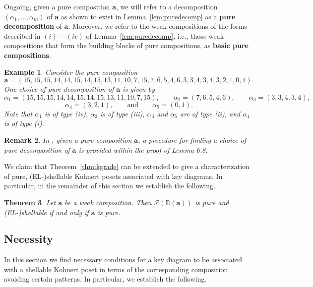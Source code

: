 \documentclass[letterpaper,10pt]{article}
\newtheorem{theorem}{Theorem}
\newtheorem{ex}[theorem]{Example}
\newtheorem{remark}[theorem]{Remark}
\begin{document}
Ongoing, given a pure composition $\mathbf{a}$, we will refer to a decomposition $(\alpha_1,\hdots,\alpha_m)$ of $\mathbf{a}$ as shown to exist in Lemma~\ref{lem:puredecomp} as a \textbf{pure decomposition} of $\mathbf{a}$. Moreover, we refer to the weak compositions of the forms described in $(i)-(iv)$  of Lemma~\ref{lem:puredecomp}, i.e., those weak compositions that form the building blocks of pure compositions, as \textbf{basic pure compositions}.

\begin{ex}
    Consider the pure composition $$\mathbf{a}=(15,15,15,14,14,15,14,15,13,11,10,7,15,7,6,5,4,6,3,3,4,3,4,3,2,1,0,1).$$ One choice of pure decomposition of $\mathbf{a}$ is given by $$\alpha_1=(15,15,15,14,14,15,14,15,13,11,10,7,15),\quad\quad\alpha_2=(7,6,5,4,6),\quad\quad\alpha_3=(3,3,4,3,4),$$ $$\alpha_4=(3,2,1),\quad\quad\text{and}\quad\quad\alpha_5=(0,1).$$ 
    Note that $\alpha_1$ is of type \textup{(iv)}, $\alpha_2$ is of type \textup{(iii)}, $\alpha_3$ and $\alpha_5$ are of type \textup{(ii)}, and $\alpha_4$ is of type \textup{(i)}.
\end{ex}

\begin{remark}
    In \textup{\textbf{\cite{KPoset1}}}, given a pure composition $\mathbf{a}$, a procedure for finding a choice of pure decomposition of $\mathbf{a}$ is provided within the proof of Lemma 6.8.
\end{remark}

We claim that Theorem~\ref{thm:kgrade} can be extended to give a characterization of pure, (EL-)shellable Kohnert posets associated with key diagrams. In particular, in the remainder of this section we establish the following.

\begin{theorem}\label{thm:kshell}
     Let $\mathbf{a}$ be a weak composition. Then $\mathcal{P}(\mathbb{D}(\mathbf{a}))$ is pure and \textup(EL-\textup)shellable if and only if $\mathbf{a}$ is pure.
\end{theorem}

\subsection{Necessity}

In this section we find necessary conditions for a key diagram to be associated with a shellable Kohnert poset in terms of the corresponding composition avoiding certain patterns. In particular, we establish the following.
\end{document}
